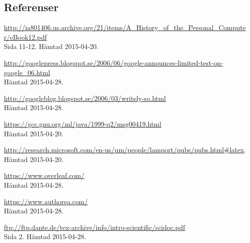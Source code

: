 \subsection{Referenser}
\vspace{-9mm}
\renewcommand{\refname}{}
\begin{thebibliography}{9}
\footnotesize
{}
\url{http://ia801406.us.archive.org/21/items/A_History_of_the_Personal_Computer/eBook12.pdf}\\
 Sida 11-12. Hämtad 2015-04-20.

\url{http://googlepress.blogspot.se/2006/06/google-announces-limited-test-on-google_06.html}\\
 Hämtad 2015-04-28.

\url{http://googleblog.blogspot.se/2006/03/writely-so.html}\\
 Hämtad 2015-04-28. 

\url{https://gcc.gnu.org/ml/java/1999-q2/msg00419.html}\\
 Hämtad 2015-04-20.

\url{http://research.microsoft.com/en-us/um/people/lamport/pubs/pubs.html#latex}.\\
 Hämtad 2015-04-20.
 
\url{https://www.overleaf.com/}\\
 Hämtad 2015-04-28.

\url{https://www.authorea.com/}\\
 Hämtad 2015-04-28.
 
\url{ftp://ftp.dante.de/tex-archive/info/intro-scientific/scidoc.pdf}\\
Sida 2. Hämtad 2015-04-28.

\end{thebibliography}

